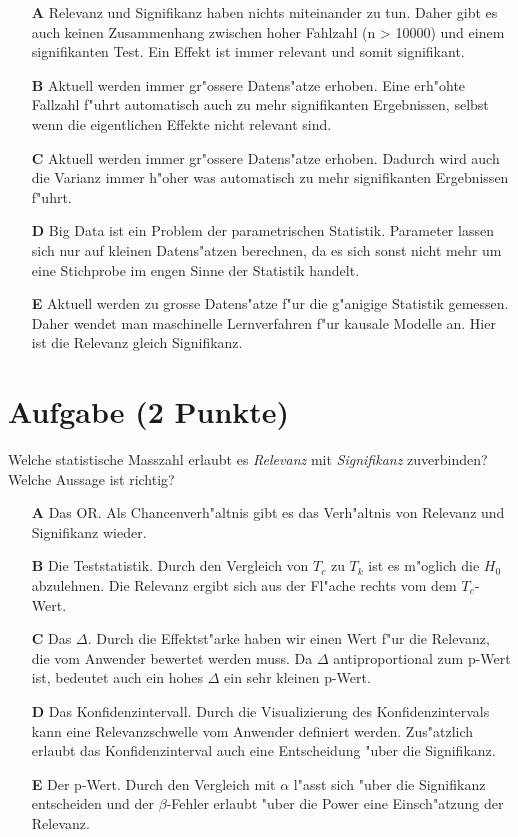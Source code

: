 \documentclass[a4paper, 10pt]{scrartcl}\usepackage[]{graphicx}\usepackage[]{xcolor}
\begin{document}
\begin{enumerate}
\item [\textbf{A} \msquare] Relevanz und Signifikanz haben nichts miteinander zu tun. Daher gibt es auch keinen Zusammenhang zwischen hoher Fahlzahl (n > 10000) und einem signifikanten Test. Ein Effekt ist immer relevant und somit signifikant.
\item [\textbf{B} \msquare] Aktuell werden immer gr{"o}ssere Datens{"a}tze erhoben. Eine erh{"o}hte Fallzahl f{"u}hrt automatisch auch zu mehr signifikanten Ergebnissen, selbst wenn die eigentlichen Effekte nicht relevant sind.
\item [\textbf{C} \msquare] Aktuell werden immer gr{"o}ssere Datens{"a}tze erhoben. Dadurch wird auch die Varianz immer h{"o}her was automatisch zu mehr signifikanten Ergebnissen f{"u}hrt.
\item [\textbf{D} \msquare] Big Data ist ein Problem der parametrischen Statistik. Parameter lassen sich nur auf kleinen Datens{"a}tzen berechnen, da es sich sonst nicht mehr um eine Stichprobe im engen Sinne der Statistik handelt.
\item [\textbf{E} \msquare] Aktuell werden zu grosse Datens{"a}tze f{"u}r die g{"a}nigige Statistik gemessen. Daher wendet man maschinelle Lernverfahren f{"u}r kausale Modelle an. Hier ist die Relevanz gleich Signifikanz.
\end{enumerate}

\section{Aufgabe \hfill (2 Punkte)}

Welche statistische Masszahl erlaubt es \textit{Relevanz} mit
\textit{Signifikanz} zuverbinden? Welche Aussage ist richtig?



\begin{enumerate}
\item [\textbf{A} \msquare] Das OR. Als Chancenverh{"a}ltnis gibt es das Verh{"a}ltnis von Relevanz und Signifikanz wieder.
\item [\textbf{B} \msquare] Die Teststatistik. Durch den Vergleich von $T_c$ zu $T_k$ ist es m{"o}glich die $H_0$ abzulehnen. Die Relevanz ergibt sich aus der Fl{"a}che rechts vom dem $T_c$-Wert.
\item [\textbf{C} \msquare] Das $\Delta$. Durch die Effektst{"a}rke haben wir einen Wert f{"u}r die Relevanz, die vom Anwender bewertet werden muss. Da $\Delta$ antiproportional zum p-Wert ist, bedeutet auch ein hohes $\Delta$ ein sehr kleinen p-Wert.
\item [\textbf{D} \msquare] Das Konfidenzintervall. Durch die Visualizierung des Konfidenzintervals kann eine Relevanzschwelle vom Anwender definiert werden. Zus{"a}tzlich erlaubt das Konfidenzinterval auch eine Entscheidung {"u}ber die Signifikanz.
\item [\textbf{E} \msquare] Der p-Wert. Durch den Vergleich mit $\alpha$ l{"a}sst sich {"u}ber die Signifikanz entscheiden und der $\beta$-Fehler erlaubt {"u}ber die Power eine Einsch{"a}tzung der Relevanz.
\end{enumerate}
\end{document}
